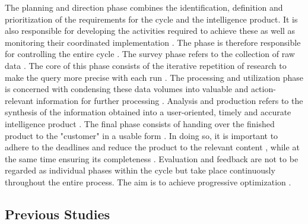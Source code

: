 \documentclass[10pt]{article}
\begin{document}
The planning and direction phase combines the identification, definition and prioritization
of the requirements for the cycle and the intelligence product. It is also responsible for
developing the activities required to achieve these \cite{DepartmentoftheArmy.2012} as well
as monitoring their coordinated implementation
\cite{JointChiefsofStaffU.S.Army.2013, DepartmentoftheArmy.2012}. The phase is therefore
responsible for controlling the entire cycle \cite{CentralIntelligenceAgency.1987}.
The survey phase refers to the collection of raw data \cite{CentralIntelligenceAgency.1987}.
The core of this phase consists of the iterative repetition of research
\cite{NorthAtlanticTreatyOrganization.2001} to make the query more precise with each run
\cite{PastorGalindo.2020}. The processing and utilization phase is concerned with condensing
these data volumes into valuable and action-relevant information for further processing
\cite{DirectorofNationalIntelligence.2011, JointChiefsofStaffU.S.Army.2013, PastorGalindo.2020, }.
Analysis and production refers to the synthesis of the information obtained into a
user-oriented, timely and accurate intelligence product
\cite{DepartmentoftheArmy.2012, Hwang.2022, NorthAtlanticTreatyOrganization.2001}.
The final phase consists of handing over the finished product to the "customer" in a
usable form \cite{CentralIntelligenceAgency.2023, DepartmentoftheArmy.2012, Williams.2018}.
In doing so, it is important to adhere to the deadlines and reduce the product to the
relevant content \cite{DepartmentoftheArmy.2012}, while at the same time ensuring its
completeness \cite{Lowenthal.2020}. Evaluation and feedback are not to be regarded as
individual phases within the cycle but take place continuously throughout the entire process.
The aim is to achieve progressive optimization
\cite{DirectorofNationalIntelligence.2011, JointChiefsofStaffU.S.Army.2013, NorthAtlanticTreatyOrganization.2001}.

\subsection{Previous Studies}
\end{document}

